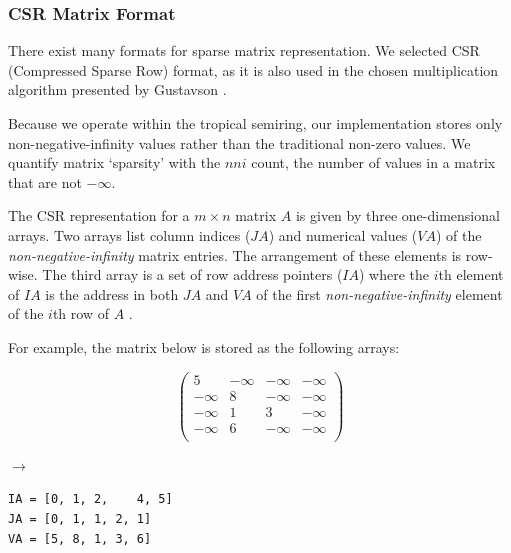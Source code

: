 \subsubsection{CSR Matrix Format}

There exist many formats for sparse matrix representation. We selected CSR (Compressed Sparse Row) format, as it is also 
used in the chosen multiplication algorithm presented by Gustavson \cite{gustavson-sparse}.

Because we operate within the tropical semiring, our implementation stores only non-negative-infinity values rather than 
the traditional non-zero values. We quantify matrix `sparsity' with the $nni$ count, the number of values in a matrix
that are not $-\infty$.

The CSR representation for a $m\times n$ matrix $A$ is given by three one-dimensional arrays. Two arrays list column 
indices ($JA$) and numerical values ($VA$) of the \textit{non-negative-infinity} matrix entries. The arrangement of 
these elements is row-wise. The third array is a set of row address pointers ($IA$) where the $i$th element of $IA$ is 
the address in both $JA$ and $VA$ of the first \textit{non-negative-infinity} element of the $i$th row of $A$ \cite{gustavson-sparse}.

\noindent
\raggedright %
For example, the matrix below is stored as the following arrays:
\vspace{-0.5em} %

\begin{center} %
\noindent
\begin{minipage}[c]{0.35\textwidth}
  \[
  \begin{pmatrix}
    5 & -\infty & -\infty & -\infty \\ 
    -\infty & 8 & -\infty & -\infty \\ 
    -\infty & 1 & 3 & -\infty \\ 
    -\infty & 6 & -\infty & -\infty \\
  \end{pmatrix}
  \]
\end{minipage}
\begin{minipage}[c]{0.1\textwidth}
  \centering
  $\xrightarrow{}$ %
\end{minipage}
\begin{minipage}[c]{0.45\textwidth}
\begin{lstlisting}[frame=none,numbers=none,basicstyle=\small\ttfamily]
IA = [0, 1, 2,    4, 5]
JA = [0, 1, 1, 2, 1]
VA = [5, 8, 1, 3, 6]
\end{lstlisting}
\end{minipage}
\end{center}

